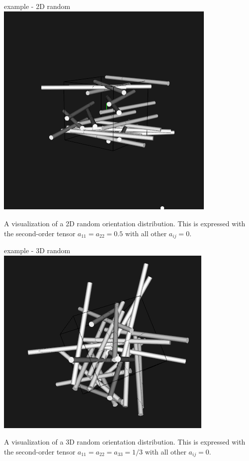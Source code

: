 \documentclass[
  letterpaper,
  ignorenonframetext,
  aspectratio=43,
  handout,
  12pt]{beamer}
\let\Oldincludegraphics\includegraphics
\renewcommand{\includegraphics}[2][]{\Oldincludegraphics[width=\textwidth,height=0.7\textheight,keepaspectratio]{#2}}
\begin{document}
\begin{frame}{example - 2D random}
\protect\hypertarget{example---2d-random}{}
\includegraphics{../images/random2D.PNG}

A visualization of a 2D random orientation distribution. This is
expressed with the second-order tensor \(a_{11} = a_{22} = 0.5\) with
all other \(a_{ij} = 0\).
\end{frame}

\begin{frame}{example - 3D random}
\protect\hypertarget{example---3d-random}{}
\includegraphics{../images/random3D.PNG}

A visualization of a 3D random orientation distribution. This is
expressed with the second-order tensor
\(a_{11} = a_{22} = a_{33} = 1/3\) with all other \(a_{ij} = 0\).
\end{frame}
\end{document}

